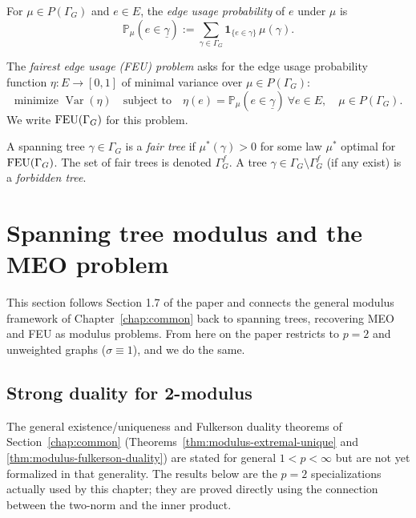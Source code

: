\begin{definition}
\label{def:edge-usage-probability}
For $\mu \in P(\Gamma_G)$ and $e \in E$, the \emph{edge usage probability} of
$e$ under $\mu$ is
\[
  \mathbb P_\mu(e \in \underline\gamma) := \sum_{\gamma \in \Gamma_G} \mathbf 1_{\{e \in \gamma\}} \, \mu(\gamma).
\]
\end{definition}

\begin{definition}
\label{def:feu}
The \emph{fairest edge usage (FEU) problem} asks for the edge usage
probability function $\eta \colon E \to [0,1]$ of minimal variance over $\mu
\in P(\Gamma_G)$:
\[
  \text{minimize } \operatorname{Var}(\eta)
  \quad \text{subject to} \quad
  \eta(e) = \mathbb P_\mu(e \in \underline\gamma) \ \forall e \in E, \quad \mu \in P(\Gamma_G).
\]
We write $\operatorname{FEU}(\Gamma_G)$ for this problem.
\end{definition}

\begin{definition}
\label{def:fair-tree}
A spanning tree $\gamma \in \Gamma_G$ is a \emph{fair tree} if $\mu^*(\gamma) >
0$ for some law $\mu^*$ optimal for $\operatorname{FEU}(\Gamma_G)$. The set of fair trees is
denoted $\Gamma_G^f$. A tree $\gamma \in \Gamma_G \setminus \Gamma_G^f$ (if any
exist) is a \emph{forbidden tree}.
\end{definition}

\section{Spanning tree modulus and the MEO problem}
\label{sec:spanning-tree-modulus}

This section follows Section 1.7 of the paper and connects the general
modulus framework of Chapter~\ref{chap:common} back to spanning trees,
recovering MEO and FEU as modulus problems. From here on the paper restricts
to $p = 2$ and unweighted graphs ($\sigma \equiv 1$), and we do the same.

\subsection{Strong duality for 2-modulus}

The general existence/uniqueness and Fulkerson duality theorems of
Section~\ref{chap:common} (Theorems~\ref{thm:modulus-extremal-unique} and
\ref{thm:modulus-fulkerson-duality}) are stated for general $1 < p < \infty$
but are not yet formalized in that generality. The results below are the
$p = 2$ specializations actually used by this chapter; they are proved
directly using the connection between the two-norm and the inner product.

